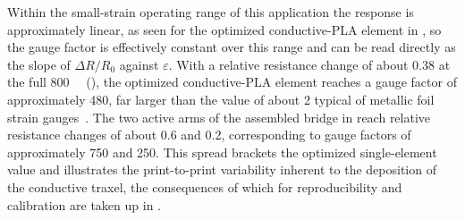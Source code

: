 Within the small-strain operating range of this application the response is approximately linear, as seen for the optimized conductive-PLA element in , so the gauge factor is effectively constant over this range and can be read directly as the slope of \(\Delta R / R_0\) against \(\varepsilon\). With a relative resistance change of about \num{0.38} at the full \SI{800}{\micro\strain} (), the optimized conductive-PLA element reaches a gauge factor of approximately \num{480}, far larger than the value of about \num{2} typical of metallic foil strain gauges~\cite{metal_gauge}. The two active arms of the assembled bridge in  reach relative resistance changes of about \num{0.6} and \num{0.2}, corresponding to gauge factors of approximately \num{750} and \num{250}. This spread brackets the optimized single-element value and illustrates the print-to-print variability inherent to the deposition of the conductive traxel, the consequences of which for reproducibility and calibration are taken up in .